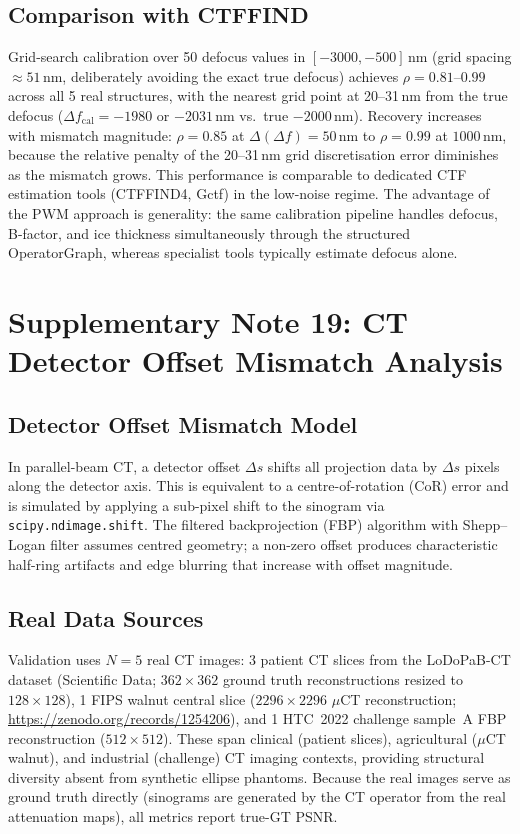 \documentclass[11pt]{article}
\begin{document}
\subsection{Comparison with CTFFIND}
Grid-search calibration over 50 defocus values in $[-3000, -500]$\,nm (grid spacing ${\approx}51$\,nm, deliberately avoiding the exact true defocus) achieves $\rho = 0.81$--$0.99$ across all 5 real structures, with the nearest grid point at 20--31\,nm from the true defocus ($\Delta f_{\mathrm{cal}} = -1980$ or $-2031$\,nm vs.\ true $-2000$\,nm).
Recovery increases with mismatch magnitude: $\rho = 0.85$ at $\Delta(\Delta f){=}50$\,nm to $\rho = 0.99$ at $1000$\,nm, because the relative penalty of the 20--31\,nm grid discretisation error diminishes as the mismatch grows.
This performance is comparable to dedicated CTF estimation tools (CTFFIND4, Gctf) in the low-noise regime.
The advantage of the PWM approach is generality: the same calibration pipeline handles defocus, B-factor, and ice thickness simultaneously through the structured OperatorGraph, whereas specialist tools typically estimate defocus alone.


\section{Supplementary Note 19: CT Detector Offset Mismatch Analysis}
\label{sec:note_cbct}

\subsection{Detector Offset Mismatch Model}
In parallel-beam CT, a detector offset $\Delta s$ shifts all projection data by $\Delta s$ pixels along the detector axis. This is equivalent to a centre-of-rotation (CoR) error and is simulated by applying a sub-pixel shift to the sinogram via \texttt{scipy.ndimage.shift}. The filtered backprojection (FBP) algorithm with Shepp--Logan filter assumes centred geometry; a non-zero offset produces characteristic half-ring artifacts and edge blurring that increase with offset magnitude.

\subsection{Real Data Sources}
Validation uses $N{=}5$ real CT images: 3 patient CT slices from the LoDoPaB-CT dataset (Scientific Data; $362 \times 362$ ground truth reconstructions resized to $128 \times 128$), 1 FIPS walnut central slice ($2296 \times 2296$ $\mu$CT reconstruction; \url{https://zenodo.org/records/1254206}), and 1 HTC~2022 challenge sample~A FBP reconstruction ($512 \times 512$). These span clinical (patient slices), agricultural ($\mu$CT walnut), and industrial (challenge) CT imaging contexts, providing structural diversity absent from synthetic ellipse phantoms. Because the real images serve as ground truth directly (sinograms are generated by the CT operator from the real attenuation maps), all metrics report true-GT PSNR.
\end{document}
